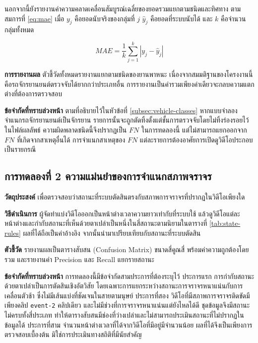 นอกจากนี้ยังรายงานค่าความคลาดเคลื่อนสัมบูรณ์เฉลี่ยของยอดรวมแยกตามชนิดและทิศทาง ตามสมการที่ \ref{eq:mae} เมื่อ $y_j$ คือยอดนับจริงของกลุ่มที่ $j$ $\hat{y}_j$ คือยอดที่ระบบนับได้ และ $k$ คือจำนวนกลุ่มทั้งหมด

\begin{equation}
    MAE = \frac{1}{k}\sum_{j=1}^{k} \left| y_j - \hat{y}_j \right|
    \label{eq:mae}
\end{equation}

\textbf{การรายงานผล} ตัวชี้วัดทั้งหมดรายงานแยกตามชนิดของยานพาหนะ เนื่องจากสมมติฐานของโครงงานนี้คือรถจักรยานยนต์ตรวจจับได้ยากกว่าประเภทอื่น การรายงานเป็นค่ารวมเพียงค่าเดียวจะกลบความแตกต่างที่ต้องการตรวจสอบ

\textbf{ข้อจำกัดที่ทราบล่วงหน้า} ตามที่อธิบายไว้ในหัวข้อที่ \ref{subsec:vehicle-classes} หากแบบจำลองจำแนกรถจักรยานยนต์เป็นจักรยาน รายการนั้นจะถูกตัดทิ้งตั้งแต่ชั้นการตรวจจับโดยไม่ทิ้งร่องรอยไว้ในไฟล์ผลลัพธ์ ความผิดพลาดชนิดนี้จึงปรากฏเป็น $FN$ ในการทดลองนี้ แต่ไม่สามารถแยกออกจาก $FN$ ที่เกิดจากสาเหตุอื่นได้  การจำแนกสาเหตุของ $FN$ แต่ละรายการต้องอาศัยการเปิดดูวิดีโอประกอบเป็นรายกรณี

\subsection{การทดลองที่ 2 ความแม่นยำของการจำแนกสภาพจราจร}
\label{subsec:exp-classification}

\textbf{วัตถุประสงค์} เพื่อตรวจสอบว่าสถานะที่ระบบตัดสินตรงกับสภาพการจราจรที่ปรากฏในวิดีโอเพียงใด

\textbf{วิธีดำเนินการ} ผู้จัดทำแบ่งวิดีโอออกเป็นหน้าต่างเวลาความยาวเท่ากับที่ระบบใช้ แล้วดูวิดีโอแต่ละหน้าต่างและกำกับสถานะที่เห็นด้วยตาเปล่าเป็นหนึ่งในสี่สถานะตามนิยามในตารางที่ \ref{tab:state-rules} ผลที่ได้ถือเป็นค่าอ้างอิง จากนั้นนำมาเปรียบเทียบกับสถานะที่ระบบตัดสิน

\textbf{ตัวชี้วัด} รายงานผลเป็นตารางสับสน (Confusion Matrix) ขนาดสี่คูณสี่ พร้อมค่าความถูกต้องโดยรวม และรายงานค่า Precision และ Recall แยกรายสถานะ

\textbf{ข้อจำกัดที่ทราบล่วงหน้า} การทดลองนี้มีข้อจำกัดสามประการที่ต้องระบุไว้  ประการแรก การกำกับสถานะด้วยตาเปล่าเป็นการตัดสินเชิงอัตวิสัย โดยเฉพาะการแยกระหว่างสถานะการจราจรหนาแน่นกับการเคลื่อนตัวช้า ซึ่งไม่มีเส้นแบ่งที่ชัดเจนในสายตามนุษย์  ประการที่สอง วิดีโอที่มีสภาพการจราจรติดขัดมีเพียงคลิป \texttt{event-2} คลิปเดียว และไม่มีช่วงที่การจราจรหนาแน่นแต่ยังไหลได้ดี ชุดข้อมูลจึงมีสถานะไม่ครบทั้งสี่ประเภท ทำให้ตารางสับสนมีช่องที่ว่างเปล่าและไม่สามารถประเมินสถานะที่ไม่ปรากฏในข้อมูลได้  ประการที่สาม จำนวนหน้าต่างเวลาที่ได้จากวิดีโอที่มีอยู่มีจำนวนน้อย ผลที่ได้จึงเป็นเพียงการตรวจสอบเบื้องต้น มิใช่การประเมินทางสถิติที่มีนัยสำคัญ


